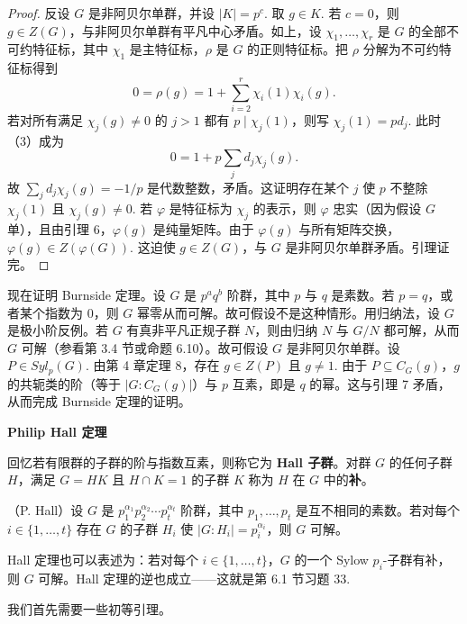 \begin{proof}
反设 \(G\) 是非阿贝尔单群，并设 \(|K| = p^c\). 取 \(g \in K\). 若 \(c = 0\)，则 \(g \in Z(G)\)，与非阿贝尔单群有平凡中心矛盾。如上，设 \(\chi_1, \ldots, \chi_r\) 是 \(G\) 的全部不可约特征标，其中 \(\chi_1\) 是主特征标，\(\rho\) 是 \(G\) 的正则特征标。把 \(\rho\) 分解为不可约特征标得到
\[
0 = \rho(g) = 1+\sum_{i=2}^{r}\chi_i(1)\chi_i(g). \tag{19.3}
\]
若对所有满足 \(\chi_j(g) \neq 0\) 的 \(j > 1\) 都有 \(p \mid \chi_j(1)\)，则写 \(\chi_j(1) = pd_j\). 此时（3）成为
\[
0 = 1+p\sum_j d_j\chi_j(g).
\]
故 \(\sum_j d_j\chi_j(g) = -1/p\) 是代数整数，矛盾。这证明存在某个 \(j\) 使 \(p\) 不整除 \(\chi_j(1)\) 且 \(\chi_j(g) \neq 0\). 若 \(\varphi\) 是特征标为 \(\chi_j\) 的表示，则 \(\varphi\) 忠实（因为假设 \(G\) 单），且由引理 6，\(\varphi(g)\) 是纯量矩阵。由于 \(\varphi(g)\) 与所有矩阵交换，\(\varphi(g) \in Z(\varphi(G))\). 这迫使 \(g \in Z(G)\)，与 \(G\) 是非阿贝尔单群矛盾。引理证完。
\end{proof}

现在证明 Burnside 定理。设 \(G\) 是 \(p^aq^b\) 阶群，其中 \(p\) 与 \(q\) 是素数。若 \(p = q\)，或者某个指数为 0，则 \(G\) 幂零从而可解。故可假设不是这种情形。用归纳法，设 \(G\) 是极小阶反例。若 \(G\) 有真非平凡正规子群 \(N\)，则由归纳 \(N\) 与 \(G/N\) 都可解，从而 \(G\) 可解（参看第 3.4 节或命题 6.10）。故可假设 \(G\) 是非阿贝尔单群。设 \(P \in Syl_p(G)\). 由第 4 章定理 8，存在 \(g \in Z(P)\) 且 \(g \neq 1\). 由于 \(P \subseteq C_G(g)\)，\(g\) 的共轭类的阶（等于 \(|G : C_G(g)|\)）与 \(p\) 互素，即是 \(q\) 的幂。这与引理 7 矛盾，从而完成 Burnside 定理的证明。

\noindent\textbf{Philip Hall 定理}

回忆若有限群的子群的阶与指数互素，则称它为 \textbf{Hall 子群}。对群 \(G\) 的任何子群 \(H\)，满足 \(G = HK\) 且 \(H \cap K = 1\) 的子群 \(K\) 称为 \(H\) 在 \(G\) 中的\textbf{补}。

\begin{theorem}\label{thm:19.8}
（P. Hall）设 \(G\) 是 \(p_1^{\alpha_1}p_2^{\alpha_2}\cdots p_t^{\alpha_t}\) 阶群，其中 \(p_1, \ldots, p_t\) 是互不相同的素数。若对每个 \(i \in \{1, \ldots, t\}\) 存在 \(G\) 的子群 \(H_i\) 使 \(|G : H_i| = p_i^{\alpha_i}\)，则 \(G\) 可解。
\end{theorem}

Hall 定理也可以表述为：若对每个 \(i \in \{1, \ldots, t\}\)，\(G\) 的一个 Sylow \(p_i\)-子群有补，则 \(G\) 可解。Hall 定理的逆也成立——这就是第 6.1 节习题 33.

我们首先需要一些初等引理。

